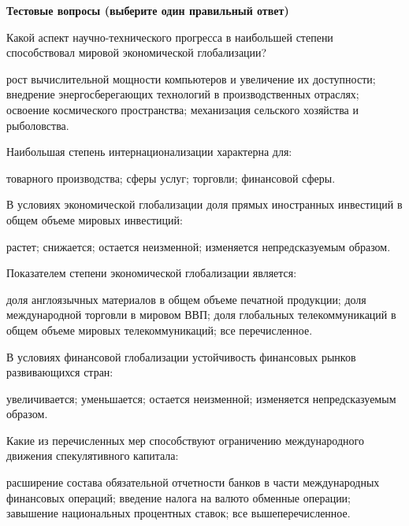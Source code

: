 \documentclass[12pt, table]{exam}
\begin{document}
\pagebreak
\noindent\textbf{Тестовые вопросы (выберите один правильный ответ)}

\begin{questions}
\begin{multicols}{2}
\setlength{\columnsep}{1cm}

\question Какой аспект научно-технического прогресса в наибольшей степени способствовал мировой экономической глобализации?
	 \begin{choices}
	 \CC рост вычислительной мощности компьютеров и увеличение их доступности;
	 \choice  внедрение энергосберегающих технологий в производственных отраслях;
	 \choice освоение космического пространства;
	 \choice механизация сельского хозяйства и рыболовства.
	 \end{choices}
\question Наибольшая степень интернационализации характерна для:
	 \begin{choices}
	 \choice товарного производства;
	 \choice сферы услуг;
	 \choice торговли;
	 \CC финансовой сферы.
	 \end{choices}
\question В условиях экономической глобализации доля прямых иностранных инвестиций в общем объеме мировых инвестиций:
	 \begin{choices}
	 \CC растет;
	 \choice снижается;
	 \choice остается неизменной;
	 \choice изменяется непредсказуемым образом.
	 \end{choices}
\question Показателем степени экономической глобализации является:
	 \begin{choices}
	 \choice доля англоязычных материалов в общем объеме печатной продукции;
	 \CC доля международной торговли в мировом ВВП;
	 \choice доля глобальных телекоммуникаций в общем объеме мировых телекоммуникаций;
	 \choice все перечисленное.
	 \end{choices}
\question В условиях финансовой глобализации устойчивость финансовых рынков развивающихся стран:
	 \begin{choices}
	 \choice увеличивается;
	 \CC уменьшается;
	 \choice остается неизменной;
	 \choice изменяется непредсказуемым образом.
	 \end{choices}
\question Какие из перечисленных мер способствуют ограничению международного движения спекулятивного капитала:
	 \begin{choices}
	 \choice расширение состава обязательной отчетности банков в части международных финансовых операций;
	 \choice введение налога на валюто обменные операции;
	 \choice завышение национальных процентных ставок;
	 \CC все вышеперечисленное.
	 \end{choices}

\end{multicols}
\end{questions}
\end{document}
